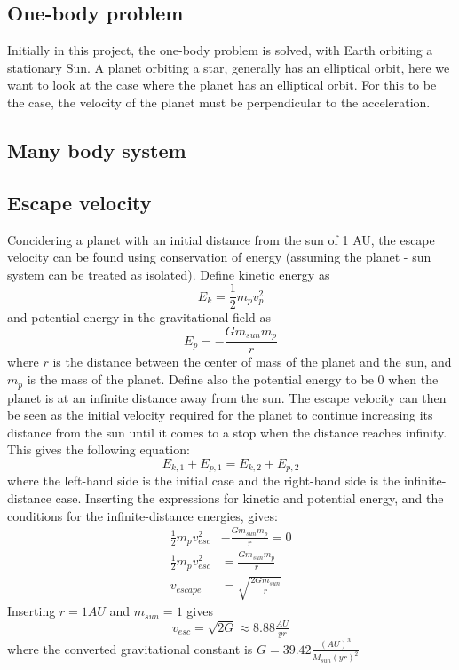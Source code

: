 \subsection{One-body problem}

Initially in this project, the one-body problem is solved, with Earth orbiting a stationary Sun. A planet orbiting a star, generally has an elliptical orbit, here we want to look at the case where the planet has an elliptical orbit. For this to be the case, the velocity of the planet must be perpendicular to the acceleration. 

\subsection{Many body system}

\subsection{Escape velocity}
Concidering a planet with an initial distance from the sun of 1 AU, the escape velocity can be
found using conservation of energy (assuming the planet - sun system can be treated as isolated).
Define kinetic energy as
$$E_k = \frac{1}{2}m_{p}v_{p}^2$$
and potential energy in the gravitational field as
$$E_p = -\frac{Gm_{sun}m_{p}}{r}$$
where $r$ is the distance between the center of mass of the planet and the sun, and $m_p$ is the
mass of the planet. Define also the potential
energy to be 0 when the planet is at an infinite distance away from the sun. The escape velocity can
then be seen as the initial velocity required for the planet to continue increasing its distance from
the sun until it comes to a stop when the distance reaches infinity. This gives the following
equation:
\begin{equation*}
E_{k,1} + E_{p,1} = E_{k,2} + E_{p,2}
\end{equation*}
where the left-hand side is the initial case and the right-hand side is the infinite-distance
case. Inserting the expressions for kinetic and potential energy, and the conditions for the
infinite-distance energies, gives:
\begin{align*}
\tfrac{1}{2}m_{p}v_{esc}^2 &- \frac{Gm_{sun}m_{p}}{r} = 0 \\
\tfrac{1}{2}m_{p}v_{esc}^2 &= \frac{Gm_{sun}m_{p}}{r} \\
v_{escape} &= \sqrt{\tfrac{2Gm_{sun}}{r}}
\end{align*}
Inserting $r = 1AU$ and $m_{sun} = 1$ gives 
\begin{equation}\label{eq:escape}
v_{esc} = \sqrt{2G} \approx 8.88\tfrac{AU}{yr}
\end{equation}
where the converted gravitational constant is $G = 39.42 \frac{(AU)^3}{M_{sun}(yr)^2}$


